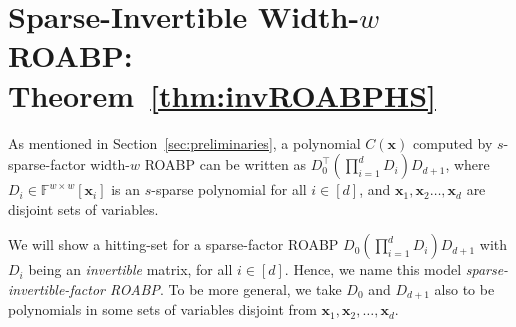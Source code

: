 \documentclass[final,oneeqnum, onethmnum, onefignum]{siamltex1213}
\newcommand{\F}{\mathbb F}
\newcommand{\abs}[1]{\lvert #1 \rvert}
\newcommand{\comment}[1]{}
\DeclareMathOperator{\paths}{paths}
\newcommand{\x}{\mathbf{x}}
\begin{document}
\section{Sparse-Invertible Width-$w$ ROABP: Theorem~\ref{thm:invROABPHS}}
\label{sec:invROABP}
\comment{
An ABP is a directed graph with $d+1$ layers of vertices
$\{V_0,V_1, \dots, V_{d}\}$ such that the edges are 
only going from $V_{i-1}$ to $V_i$ for any $i \in [d]$. 
As a convention, $V_0$ and $V_d$ have only one node each,
 let the nodes be $v_0$ and $v_d$ respectively.
A width-$w$ ABP has $\abs{V_i} \leq w$ for all $i \in [d]$.
Let the set of nodes in $V_i$ be $\{v_{i,j} \mid j \in [w]\}$.
All the edges in the graph have weights from $\F[\mathbf{x}]$,
for some field $\F$. For an edge $e$, let us denote
its weight by $w(e)$.
For a path $p$ from $v_0$ to $v_d$,
its weight $w(p)$ is defined to be the product of weights of all the edges
in it, i.e.\ $\prod_{e \in p}w(e)$. 
Consider the polynomial $C(\mathbf{x}) = \sum_{p \in \paths(v_0,v_d)} w(p)$ 
which is the sum of the weights of all the paths from $v_0$ to $v_d$.
This polynomial $C(\mathbf{x})$ is said to be computed by the ABP.

It is easy to see that this polynomial is the same as
$D_0^{\top} (\prod_{i=1}^{d-2} D_i ) D_{d-1} $,
where $D_0,D_{d-1} \in (\F[\mathbf{x}])^w$ 
and $D_i$ for $1 \leq i \leq d-2$
is a $w \times w$ matrix such that 
\begin{eqnarray*}
D_0(\ell) &=& w(v_{0},v_{1,\ell}) \text{ for } 1 \leq \ell \leq w\\
D_i(k, \ell) &=& w(v_{i,k},v_{i+1,\ell}) \text{ for } 1 \leq \ell,k \leq w \text{ and } 1 \leq i \leq d-2\\
D_{d-1}(k) &=& w(v_{d-1,k},v_{d}) \text{ for } 1 \leq k \leq w
\end{eqnarray*}
}
As mentioned in Section~\ref{sec:preliminaries},
a polynomial $C(\x)$ computed by $s$-sparse-factor width-$w$ ROABP
can be written as $D_0^{\top} (\prod_{i=1}^d D_i ) D_{d+1}  $,
where $D_i \in \F^{w \times w}[\x_i]$ is an $s$-sparse polynomial 
for all $i \in [d]$, and $\x_1,\x_2 \dots, \x_d$ are disjoint 
sets of variables. 

We will show a hitting-set for a sparse-factor ROABP 
$D_0 (\prod_{i=1}^{d} D_i ) D_{d+1} $ with 
$D_i$ being an {\em invertible} matrix, for all $i \in [d]$.
Hence, we name this model \emph{sparse-invertible-factor ROABP}.  
To be more general, we take $D_0$ and $D_{d+1}$ also to be polynomials
in some sets of variables disjoint from $\x_1, \x_2, \dots, \x_d$.
\end{document}
